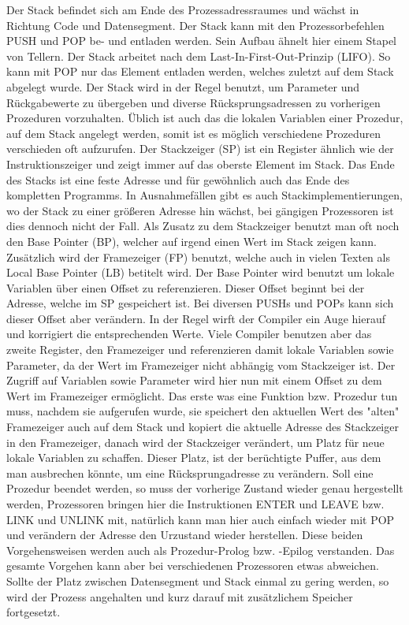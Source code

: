 \documentclass[12pt]{book}
\begin{document}
Der Stack befindet sich am Ende des Prozessadressraumes und wächst in Richtung
Code und Datensegment. Der Stack kann mit den Prozessorbefehlen PUSH und POP be-
und entladen werden. Sein Aufbau ähnelt hier einem Stapel von Tellern. Der Stack
arbeitet nach dem Last-In-First-Out-Prinzip (LIFO). So kann mit POP nur das
Element entladen werden, welches zuletzt auf dem Stack abgelegt wurde. Der Stack
wird in der Regel benutzt, um Parameter und Rückgabewerte zu übergeben und
diverse Rücksprungsadressen zu vorherigen Prozeduren vorzuhalten. Üblich ist
auch das die lokalen Variablen einer Prozedur, auf dem Stack angelegt werden,
somit ist es möglich verschiedene Prozeduren verschieden oft aufzurufen. Der
Stackzeiger (SP) ist ein Register ähnlich wie der Instruktionszeiger und zeigt
immer auf das oberste Element im Stack. Das Ende des Stacks ist eine feste
Adresse und für gewöhnlich auch das Ende des kompletten Programms. In
Ausnahmefällen gibt es auch Stackimplementierungen, wo der Stack zu einer
größeren Adresse hin wächst, bei gängigen Prozessoren ist dies dennoch nicht der
Fall. Als Zusatz zu dem Stackzeiger benutzt man oft noch den Base Pointer (BP),
welcher auf irgend einen Wert im Stack zeigen kann. Zusätzlich wird der
Framezeiger (FP) benutzt, welche auch in vielen Texten als Local Base Pointer
(LB) betitelt wird. Der Base Pointer wird benutzt um lokale Variablen über einen
Offset zu referenzieren. Dieser Offset beginnt bei der Adresse, welche im SP
gespeichert ist. Bei diversen PUSHs und POPs kann sich dieser Offset aber
verändern. In der Regel wirft der Compiler ein Auge hierauf und korrigiert die
entsprechenden Werte. Viele Compiler benutzen aber das zweite Register, den
Framezeiger und referenzieren damit lokale Variablen sowie Parameter, da der
Wert im Framezeiger nicht abhängig vom Stackzeiger ist. Der Zugriff auf
Variablen sowie Parameter wird hier nun mit einem Offset zu dem Wert im
Framezeiger ermöglicht. Das erste was eine Funktion bzw. Prozedur tun muss,
nachdem sie aufgerufen wurde, sie speichert den aktuellen Wert des "alten"
Framezeiger auch auf dem Stack und kopiert die aktuelle Adresse des Stackzeiger
in den Framezeiger, danach wird der Stackzeiger verändert, um Platz für neue
lokale Variablen zu schaffen. Dieser Platz, ist der berüchtigte Puffer, aus dem
man ausbrechen könnte, um eine Rücksprungadresse zu verändern. Soll eine
Prozedur beendet werden, so muss der vorherige Zustand wieder genau hergestellt
werden, Prozessoren bringen hier die Instruktionen ENTER und LEAVE bzw. LINK und
UNLINK mit, natürlich kann man hier auch einfach wieder mit POP und verändern
der Adresse den Urzustand wieder herstellen. Diese beiden Vorgehensweisen werden
auch als Prozedur-Prolog bzw. -Epilog verstanden. Das gesamte Vorgehen kann aber
bei verschiedenen Prozessoren etwas abweichen. Sollte der Platz zwischen
Datensegment und Stack einmal zu gering werden, so wird der Prozess angehalten
und kurz darauf mit zusätzlichem Speicher fortgesetzt.
\end{document}
